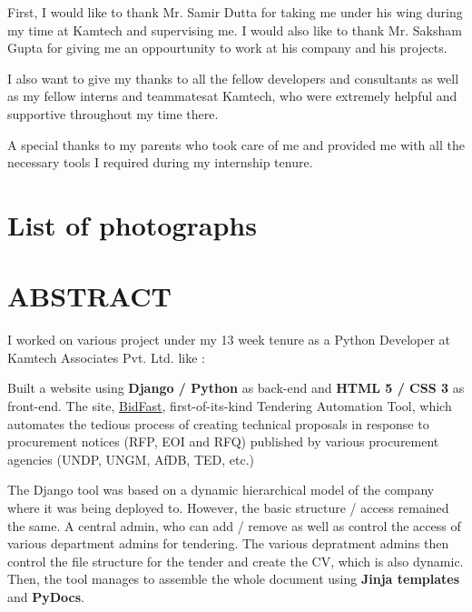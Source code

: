 \documentclass[14pt]{extarticle}
\begin{document}
\par First, I would like to thank Mr. Samir Dutta for taking me under his wing during my time at Kamtech and supervising me. I would also like to thank Mr. Saksham Gupta for giving me an oppourtunity to work at his company and his projects.

\par I also want to give my thanks to all the fellow developers and consultants as well as my fellow interns and teammatesat Kamtech, who were extremely helpful and supportive throughout my time there.

\par A special thanks to my parents who took care of me and provided me with all the necessary tools I required during my internship tenure.

\newpage
{}
\listoffigures

\newpage
{}
\listoftables

\newpage
{}
\section*{List of photographs}

\newpage
{}
\section*{ABSTRACT}
\onehalfspacing

I worked on various project under my 13 week tenure as a Python Developer at Kamtech Associates Pvt. Ltd. like :

Built a website using \textbf{Django / Python} as back-end and \textbf{HTML 5 / CSS 3} as front-end. The site, \href{https://edubild.com/bidfast/}{BidFast}, first-of-its-kind Tendering Automation Tool, which automates the tedious process of creating technical proposals in response to procurement notices (RFP, EOI and RFQ) published by various procurement agencies (UNDP, UNGM, AfDB, TED, etc.)

The Django tool was based on a dynamic hierarchical model of the company where it was being deployed to. However, the basic structure / access remained the same. A central admin, who can add / remove as well as control the access of various department admins for tendering. The various depratment admins then control the file structure for the tender and create the CV, which is also dynamic. Then, the tool manages to assemble the whole document using \textbf{Jinja templates} and \textbf{PyDocs}.
\end{document}
